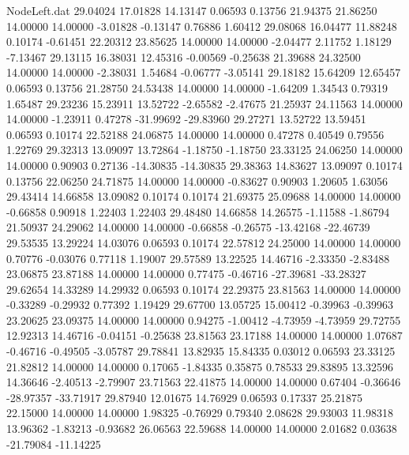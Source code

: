\begin{filecontents}{NodeLeft.dat}
  29.04024   17.01828   14.13147     0.06593    0.13756   21.94375   21.86250   14.00000   14.00000   -3.01828   -0.13147    0.76886    1.60412
  29.08068   16.04477   11.88248     0.10174   -0.61451   22.20312   23.85625   14.00000   14.00000   -2.04477    2.11752    1.18129   -7.13467
  29.13115   16.38031   12.45316    -0.00569   -0.25638   21.39688   24.32500   14.00000   14.00000   -2.38031    1.54684   -0.06777   -3.05141
  29.18182   15.64209   12.65457     0.06593    0.13756   21.28750   24.53438   14.00000   14.00000   -1.64209    1.34543    0.79319    1.65487
  29.23236   15.23911   13.52722    -2.65582   -2.47675   21.25937   24.11563   14.00000   14.00000   -1.23911    0.47278  -31.99692  -29.83960
  29.27271   13.52722   13.59451     0.06593    0.10174   22.52188   24.06875   14.00000   14.00000    0.47278    0.40549    0.79556    1.22769
  29.32313   13.09097   13.72864    -1.18750   -1.18750   23.33125   24.06250   14.00000   14.00000    0.90903    0.27136  -14.30835  -14.30835
  29.38363   14.83627   13.09097     0.10174    0.13756   22.06250   24.71875   14.00000   14.00000   -0.83627    0.90903    1.20605    1.63056
  29.43414   14.66858   13.09082     0.10174    0.10174   21.69375   25.09688   14.00000   14.00000   -0.66858    0.90918    1.22403    1.22403
  29.48480   14.66858   14.26575    -1.11588   -1.86794   21.50937   24.29062   14.00000   14.00000   -0.66858   -0.26575  -13.42168  -22.46739
  29.53535   13.29224   14.03076     0.06593    0.10174   22.57812   24.25000   14.00000   14.00000    0.70776   -0.03076    0.77118    1.19007
  29.57589   13.22525   14.46716    -2.33350   -2.83488   23.06875   23.87188   14.00000   14.00000    0.77475   -0.46716  -27.39681  -33.28327
  29.62654   14.33289   14.29932     0.06593    0.10174   22.29375   23.81563   14.00000   14.00000   -0.33289   -0.29932    0.77392    1.19429
  29.67700   13.05725   15.00412    -0.39963   -0.39963   23.20625   23.09375   14.00000   14.00000    0.94275   -1.00412   -4.73959   -4.73959
  29.72755   12.92313   14.46716    -0.04151   -0.25638   23.81563   23.17188   14.00000   14.00000    1.07687   -0.46716   -0.49505   -3.05787
  29.78841   13.82935   15.84335     0.03012    0.06593   23.33125   21.82812   14.00000   14.00000    0.17065   -1.84335    0.35875    0.78533
  29.83895   13.32596   14.36646    -2.40513   -2.79907   23.71563   22.41875   14.00000   14.00000    0.67404   -0.36646  -28.97357  -33.71917
  29.87940   12.01675   14.76929     0.06593    0.17337   25.21875   22.15000   14.00000   14.00000    1.98325   -0.76929    0.79340    2.08628
  29.93003   11.98318   13.96362    -1.83213   -0.93682   26.06563   22.59688   14.00000   14.00000    2.01682    0.03638  -21.79084  -11.14225

\end{filecontents}
